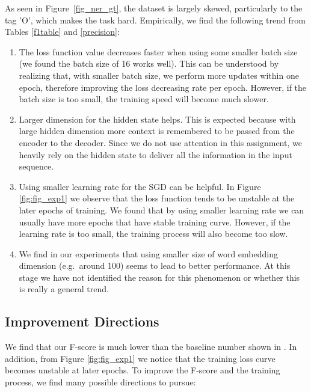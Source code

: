 \documentclass[11pt,a4paper]{article}
\begin{document}
As seen in Figure~\ref{fig_ner_gt}, the dataset is largely skewed, particularly to the tag 'O', which makes the task hard. Empirically, we find the following trend from Tables \ref{f1table} and \ref{precision}:
\begin{enumerate}
	\item The loss function value decreases faster when using some smaller batch size (we found the batch size of 16 works well). This can be understood by realizing that, with smaller batch size, we perform more updates within one epoch, therefore improving the loss decreasing rate per epoch. However, if the batch size is too small, the training speed will become much slower.
    \item Larger dimension for the hidden state helps. This is expected because with large hidden dimension more context is remembered to be passed from the encoder to the decoder. Since we do not use attention in this assignment, we heavily rely on the hidden state to deliver all the information in the input sequence.
    \item Using smaller learning rate for the SGD can be helpful. In Figure \ref{fig:fig_exp1} we observe that the loss function tends to be unstable at the later epochs of training. We found that by using smaller learning rate we can usually have more epochs that have stable training curve. However, if the learning rate is too small, the training process will also become too slow.
    \item We find in our experiments that using smaller size of word embedding dimension (e.g.~around 100) seems to lead to better performance. At this stage we have not identified the reason for this phenomenon or whether this is really a general trend.
\end{enumerate}




\subsection{Improvement Directions}
\label{ssec:Improvement}

We find that our F-score is much lower than the baseline number shown in \citet{goyal2018continuous}. In addition, from Figure \ref{fig:fig_exp1} we notice that the training loss curve becomes unstable at later epochs. To improve the F-score and the training process, we find many possible directions to pursue:
\end{document}
